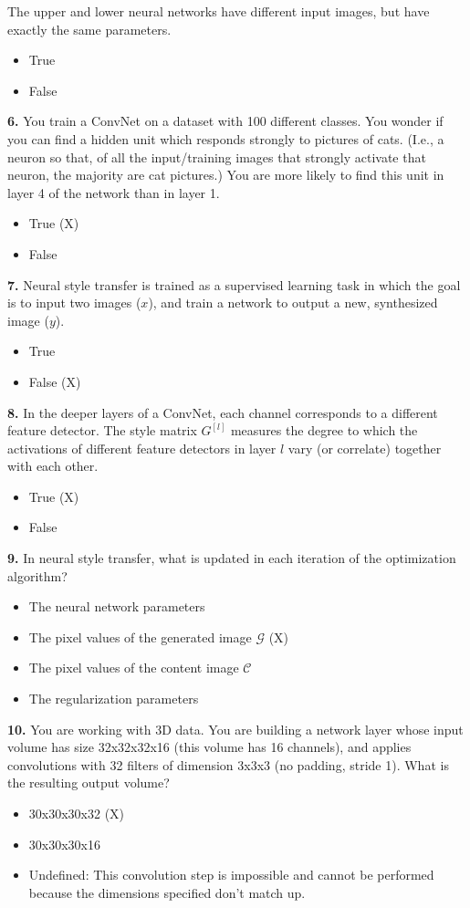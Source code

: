 The upper and lower neural networks have different input images, but have exactly the same parameters.
\begin{itemize}
    \item True
    \item False
\end{itemize}
\textbf{6.} You train a ConvNet on a dataset with 100 different classes. You wonder if you can find a hidden unit which responds strongly to pictures of cats. (I.e., a neuron so that, of all the input/training images that strongly activate that neuron, the majority are cat pictures.) You are more likely to find this unit in layer 4 of the network than in layer 1.
\begin{itemize}
    \item True (X)
    \item False
\end{itemize}
\textbf{7.} Neural style transfer is trained as a supervised learning task in which the goal is to input two images ($x$), and train a network to output a new, synthesized image ($y$).
\begin{itemize}
    \item True
    \item False (X)
\end{itemize}
\textbf{8.} In the deeper layers of a ConvNet, each channel corresponds to a different feature detector. The style matrix $G^{[l]}$  measures the degree to which the activations of different feature detectors in layer $l$ vary (or correlate) together with each other.
\begin{itemize}
    \item True (X)
    \item False
\end{itemize}
\textbf{9.} In neural style transfer, what is updated in each iteration of the optimization algorithm?
\begin{itemize}
    \item The neural network parameters
    \item The pixel values of the generated image $\mathcal{G}$ (X)
    \item The pixel values of the content image $\mathcal{C}$
    \item The regularization parameters
\end{itemize}
\textbf{10.} You are working with 3D data. You are building a network layer whose input volume has size 32x32x32x16 (this volume has 16 channels), and applies convolutions with 32 filters of dimension 3x3x3 (no padding, stride 1). What is the resulting output volume?
\begin{itemize}
    \item 30x30x30x32 (X)
    \item 30x30x30x16
    \item Undefined: This convolution step is impossible and cannot be performed because the dimensions specified don’t match up.
\end{itemize}